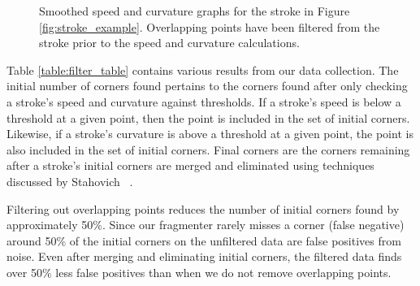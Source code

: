 \documentclass[10pt]{acmsiggraph}          %
\begin{document}
\begin{figure}[t]
  \centering
  \caption{Smoothed speed and curvature graphs for the stroke in Figure \ref{fig:stroke_example}. Overlapping points have been filtered from the stroke
  prior to the speed and curvature calculations.}
  \label{fig:filtered}
\end{figure}

Table \ref{table:filter_table} contains various results from our data collection. The initial number of corners found pertains to the corners found after only checking a stroke's 
speed and curvature against thresholds. If a stroke's speed is below a threshold at a given point, then the point is included in the set of initial corners. Likewise, if
a stroke's curvature is above a threshold at a given point, the point is also included in the set of initial corners. Final corners are the corners remaining after a stroke's initial corners are merged and eliminated using techniques discussed by Stahovich ~.

Filtering out overlapping points reduces the number of initial corners found by approximately 50\%. Since our fragmenter rarely misses a corner (false negative) around 50\% of the initial corners on the unfiltered data are false positives from noise. Even after merging and eliminating initial corners, the filtered data finds over 50\% less false positives than when we do not remove overlapping points.
\end{document}
